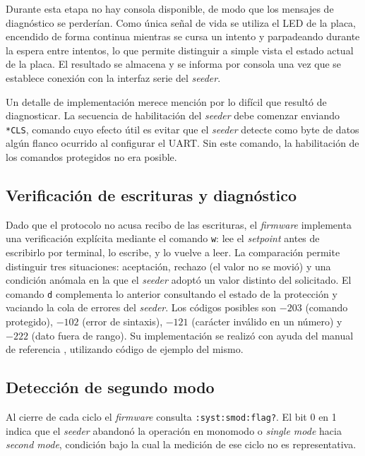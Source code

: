 Durante esta etapa no hay consola disponible, de modo que los mensajes de diagnóstico se perderían. Como única señal de vida se utiliza el LED de la placa, encendido de forma continua mientras se cursa un intento y parpadeando durante la espera entre intentos, lo que permite distinguir a simple vista el estado actual de la placa. El resultado se almacena y se informa por consola una vez que se establece conexión con la interfaz serie del \emph{seeder}.

Un detalle de implementación merece mención por lo difícil que resultó de diagnosticar. La secuencia de habilitación del \emph{seeder} debe comenzar enviando \texttt{*CLS}, comando cuyo efecto útil es evitar que el \emph{seeder} detecte como byte de datos algún flanco ocurrido al configurar el UART. Sin este comando, la habilitación de los comandos protegidos no era posible.

\subsection{Verificación de escrituras y diagnóstico}

Dado que el protocolo no acusa recibo de las escrituras, el \emph{firmware} implementa una verificación explícita mediante el comando \texttt{w}: lee el \emph{setpoint} antes de escribirlo por terminal, lo escribe, y lo vuelve a leer. La comparación permite distinguir tres situaciones: aceptación, rechazo (el valor no se movió) y una condición anómala en la que el \emph{seeder} adoptó un valor distinto del solicitado. El comando \texttt{d} complementa lo anterior consultando el estado de la protección y vaciando la cola de errores del \emph{seeder}. Los códigos posibles son $-203$ (comando protegido), $-102$ (error de sintaxis), $-121$ (carácter inválido en un número) y $-222$ (dato fuera de rango). Su implementación se realizó con ayuda del manual de referencia \cite{npphotonics_flm005}, utilizando código de ejemplo del mismo.


\subsection{Detección de segundo modo}

Al cierre de cada ciclo el \emph{firmware} consulta \texttt{:syst:smod:flag?}. El bit 0 en 1 indica que el \emph{seeder} abandonó la operación en monomodo o \textit{single mode} hacia \emph{second mode}, condición bajo la cual la medición de ese ciclo no es representativa.

